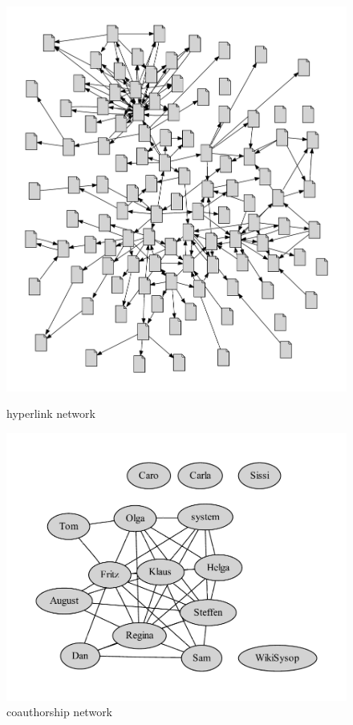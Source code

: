 \documentclass[a4paper]{scrartcl}
\begin{document}
\clearpage

\begin{figure}
  \parbox[b]{.5\textwidth}{%
    \includegraphics[width=\linewidth]{gv_pagegraph}
    \caption{hyperlink network}
    \label{fig:hyperlink}
  }%
  \parbox[b]{.5\textwidth}{%
    \includegraphics[width=\linewidth]{gv_coauthorgraph-full}\vspace{1cm}
    \caption{coauthorship network}
    \label{fig:coauthor}
  }
\end{figure}
\end{document}
